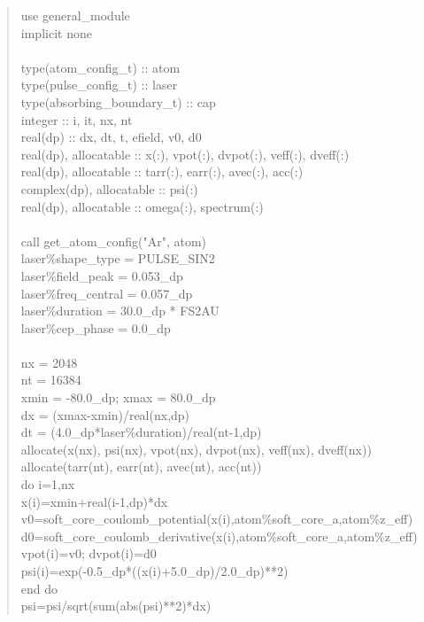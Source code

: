 \documentclass[UTF8,openany,11pt,fontset=fandol]{ctexbook}
\begin{document}
\begin{quote}
use general\_module\\
implicit none\\
~\\
type(atom\_config\_t) :: atom\\
type(pulse\_config\_t) :: laser\\
type(absorbing\_boundary\_t) :: cap\\
integer :: i, it, nx, nt\\
real(dp) :: dx, dt, t, efield, v0, d0\\
real(dp), allocatable :: x(:), vpot(:), dvpot(:), veff(:), dveff(:)\\
real(dp), allocatable :: tarr(:), earr(:), avec(:), acc(:)\\
complex(dp), allocatable :: psi(:)\\
real(dp), allocatable :: omega(:), spectrum(:)\\
~\\
call get\_atom\_config("Ar", atom)\\
laser\%shape\_type = PULSE\_SIN2\\
laser\%field\_peak = 0.053\_dp\\
laser\%freq\_central = 0.057\_dp\\
laser\%duration = 30.0\_dp * FS2AU\\
laser\%cep\_phase = 0.0\_dp\\
~\\
nx = 2048\\
nt = 16384\\
xmin = -80.0\_dp; xmax = 80.0\_dp\\
dx = (xmax-xmin)/real(nx,dp)\\
dt = (4.0\_dp*laser\%duration)/real(nt-1,dp)\\
allocate(x(nx), psi(nx), vpot(nx), dvpot(nx), veff(nx), dveff(nx))\\
allocate(tarr(nt), earr(nt), avec(nt), acc(nt))\\
do i=1,nx\\
x(i)=xmin+real(i-1,dp)*dx\\
v0=soft\_core\_coulomb\_potential(x(i),atom\%soft\_core\_a,atom\%z\_eff)\\
d0=soft\_core\_coulomb\_derivative(x(i),atom\%soft\_core\_a,atom\%z\_eff)\\
vpot(i)=v0; dvpot(i)=d0\\
psi(i)=exp(-0.5\_dp*((x(i)+5.0\_dp)/2.0\_dp)**2)\\
end do\\
psi=psi/sqrt(sum(abs(psi)**2)*dx)\\

\end{quote}
\end{document}
